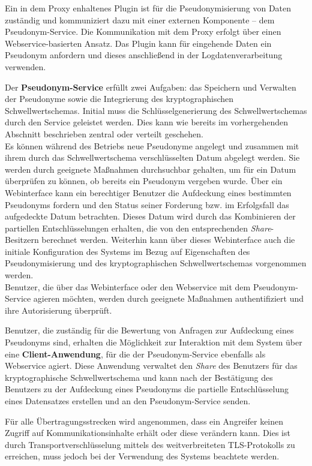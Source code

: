 Ein in dem Proxy enhaltenes Plugin ist für die Pseudonymisierung von Daten zuständig und kommuniziert dazu mit einer externen Komponente -- dem Pseudonym-Service. Die Kommunikation mit dem Proxy erfolgt über einen Webservice-basierten Ansatz. Das Plugin kann für eingehende Daten ein Pseudonym anfordern und dieses anschließend in der Logdatenverarbeitung verwenden.

Der \textbf{Pseudonym-Service} erfüllt zwei Aufgaben: das Speichern und Verwalten der Pseudonyme sowie die Integrierung des kryptographischen Schwellwertschemas. Initial muss die Schlüsselgenerierung des Schwellwertschemas durch den Service geleistet werden. Dies kann wie bereits im vorhergehenden Abschnitt beschrieben zentral oder verteilt geschehen.\\
Es können während des Betriebs neue Pseudonyme angelegt und zusammen mit ihrem durch das Schwellwertschema verschlüsselten Datum abgelegt werden. Sie werden durch geeignete Maßnahmen durchsuchbar gehalten, um für ein Datum überprüfen zu können, ob bereits ein Pseudonym vergeben wurde. 
Über ein Webinterface kann ein berechtiger Benutzer die Aufdeckung eines bestimmten Pseudonyms fordern und den Status seiner Forderung bzw. im Erfolgsfall das aufgedeckte Datum betrachten. Dieses Datum wird durch das Kombinieren der partiellen Entschlüsselungen erhalten, die von den entsprechenden \textit{Share}-Besitzern berechnet werden. Weiterhin kann über dieses Webinterface auch die initiale Konfiguration des Systems im Bezug auf Eigenschaften des Pseudonymisierung und des kryptographischen Schwellwertschemas vorgenommen werden.\\
Benutzer, die über das Webinterface oder den Webservice mit dem Pseudonym-Service agieren möchten, werden durch geeignete Maßnahmen authentifiziert und ihre Autorisierung überprüft.

Benutzer, die zuständig für die Bewertung von Anfragen zur Aufdeckung eines Pseudonyms sind, erhalten die Möglichkeit zur Interaktion mit dem System über eine \textbf{Client-Anwendung}, für die der Pseudonym-Service ebenfalls als Webservice agiert. Diese Anwendung verwaltet den \textit{Share} des Benutzers für das kryptographische Schwellwertschema und kann nach der Bestätigung des Benutzers zu der Aufdeckung eines Pseudonyms die partielle Entschlüsselung eines Datensatzes erstellen und an den Pseudonym-Service senden.

Für alle Übertragungsstrecken wird angenommen, dass ein Angreifer keinen Zugriff auf Kommunikationsinhalte erhält oder diese verändern kann. Dies ist durch Transportverschlüsselung mittels des weitverbreiteten TLS-Protokolls zu erreichen, muss jedoch bei der Verwendung des Systems beachtete werden. 